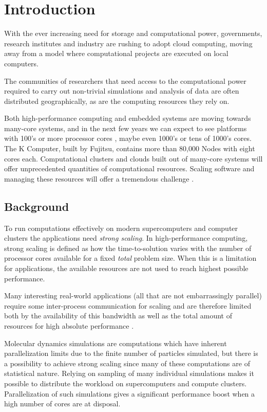 \chapter{Introduction}
With the ever increasing need for storage and computational power,
governments, research institutes and industry are rushing to adopt
cloud computing, moving away from a model where computational projects
are executed on local computers.

The communities of researchers that need access to the computational
power required to carry out non-trivial simulations and analysis of
data are often distributed geographically, as are the computing
resources they rely on.

Both high-performance computing and embedded systems are moving
towards many-core systems, and in the next few years we can expect to
see platforms with 100's or more processor cores \citep{leupers:2011},
maybe even 1000's or tens of 1000's cores. The K Computer, built by
Fujitsu, contains more than 80,000 Nodes with eight cores
each. Computational clusters and clouds built out of many-core systems
will offer unprecedented quantities of computational
resources. Scaling software and managing these resources will offer a
tremendous challenge \citep{csail:2009}.


\section{Background}
To run computations effectively on modern supercomputers and computer
clusters the applications need \emph{strong scaling}. In
high-performance computing, strong scaling is defined as how the
time-to-solution varies with the number of processor cores available
for a fixed \emph{total} problem size. When this is a limitation for
applications, the available resources are not used to reach highest
possible performance.

Many interesting real-world applications (all that are not
embarrassingly parallel) require some inter-process communication for
scaling and are therefore limited both by the availability of this
bandwidth as well as the total amount of resources for high absolute
performance \citep{pronk:2011}.

Molecular dynamics simulations are computations which have inherent
parallelization limits due to the finite number of particles
simulated, but there is a possibility to achieve strong scaling since
many of these computations are of statistical nature. Relying on
sampling of many individual simulations makes it possible to
distribute the workload on supercomputers and compute
clusters. Parallelization of such simulations gives a significant
performance boost when a high number of cores are at disposal.

